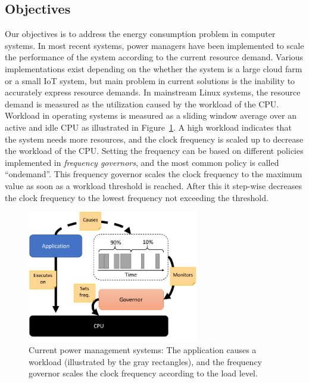 \documentclass{article}
\begin{document}
\subsection{Objectives}
Our objectives is to address the energy consumption problem in computer systems.
In most recent systems, power managers have been implemented to scale the performance of the system according to the current resource demand.
Various implementations exist depending on the whether the system is a large cloud farm or a small IoT system, 
but main problem in current solutions is the inability to accurately express resource demands.
In mainstream Linux systems, the resource demand is measured as the utilization caused by the workload of the CPU. 
Workload in operating systems is measured as a sliding window average over an active and idle CPU as illustrated in Figure~\ref{fig:workload}. 
A high workload indicates that the system needs more resources, and the clock frequency is scaled up to decrease the workload of the CPU.
Setting the frequency can be based on different policies implemented in \textit{frequency governors}, and the most common policy is called ``ondemand''\cite{ondemand}.
This frequency governor scales the clock frequency to the maximum value as soon as a workload threshold is reached.
After this it step-wise decreases the clock frequency to the lowest frequency not exceeding the threshold.\smallskip 
\begin{figure}
  \begin{center}
    \vspace{-0.8cm}
    \includegraphics[width=7.5cm]{fig/WorkloadMonitor.png}
  \end{center}
  \caption{Current power management systems: The application causes a workload (illustrated by the gray rectangles), and the frequency governor scales the clock frequency according to the load level.}
  \label{fig:workload}
\end{figure}
\end{document}
